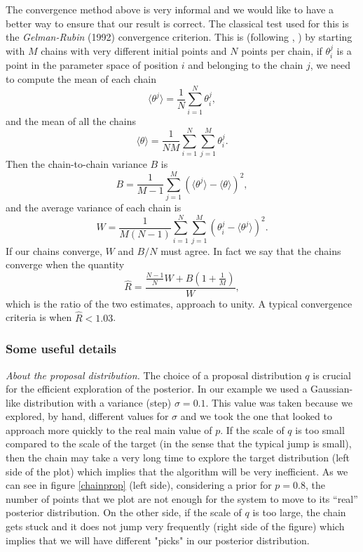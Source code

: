 \documentclass[onecolumn,           %
               showpacs,            %
               preprintnumbers,     %
               aps,                 %
               letterpaper,             %
               superscriptaddress,      %
               nofootinbib,         %
               tightenlines,        %
               floats,floatfix      %
               ,usenatbib,
               ]{revtex4-1}
\begin{document}
The convergence method above is very informal and we would like to have a better way to ensure that our result is correct. The classical test used for this is the \textit{Gelman-Rubin} (1992) convergence criterion. This is (following \cite{LicV2}, \cite{AlanH}) by starting with $M$ chains with very different initial points and $N$ points per chain, if $\theta_i^j$ is a point in the parameter space of position $i$ and belonging to the chain $j$, we need to compute the mean of each chain 
\begin{equation}
\langle\theta^j\rangle =\frac{1}{N}\sum_{i=1}^N \theta_i^j,
\end{equation}
and the mean of all the chains
\begin{equation}
\langle\theta\rangle =\frac{1}{NM}\sum_{i=1}^N\sum_{j=1}^M\theta_i^j.
\end{equation}
Then the chain-to-chain variance $B$ is
\begin{equation}
B=\frac{1}{M-1}\sum_{j=1}^M(\langle\theta^j\rangle-\langle\theta\rangle)^2 ,
\end{equation}
and the average variance of each chain is
\begin{equation}
W=\frac{1}{M(N-1)}\sum_{i=1}^N\sum_{j=1}^M(\theta_i^j-\langle\theta^j\rangle)^2 .
\end{equation}
If our chains converge, $W$ and $B/N$ must agree. In fact we say that the chains converge when the quantity
\begin{equation}
\hat R=\frac{\frac{N-1}{N}W+B(1+\frac{1}{M})}{W},
\end{equation}
which is the ratio of the two estimates, approach to unity. A typical convergence criteria is when $\hat R<1.03$. 

\subsubsection{Some useful details}

\textit{About the proposal distribution.} The choice of a proposal distribution $q$ is crucial for the efficient exploration of the posterior. In our example we used a Gaussian-like distribution with a variance (step) $\sigma=0.1$. This value was taken because we explored, by hand, different values for $\sigma$ and we took the one that looked to approach more quickly to the real main value of $p$. If the scale of $q$ is too small compared to the scale of the target (in the sense that the typical jump is small), then the chain may take a very long time to explore the target distribution (left side of the plot) which implies that the algorithm will be very inefficient. As we can see in figure \ref{chainprop} (left side), considering a prior for $p=0.8$, the number of points that we plot are not enough for the system to move to its ``real'' posterior distribution. On the other side, if the scale of $q$ is too large, the chain gets stuck and it does not jump very frequently (right side of the figure) which implies that we will have different "picks" in our posterior distribution.    
\end{document}
